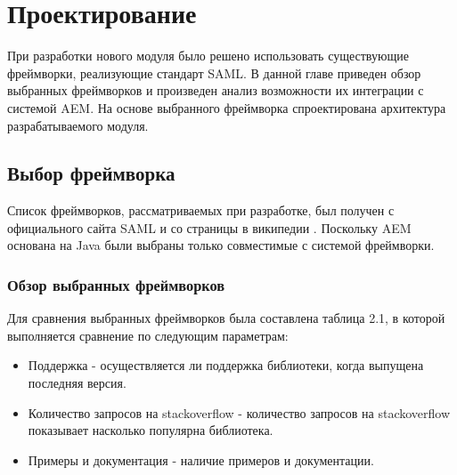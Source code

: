 \chapter{Проектирование}
\label{cha:design}

При разработки нового модуля было решено использовать существующие фреймворки, реализующие стандарт SAML. В данной главе приведен обзор выбранных фреймворков и произведен анализ возможности их интеграции с системой AEM. На основе выбранного фреймворка спроектирована архитектура разрабатываемого модуля. 

\section{Выбор фреймворка}
Список фреймворков, рассматриваемых при разработке, был получен с официального сайта SAML \cite{web:samlFrameworksOasis} и со страницы в википедии \cite{web:samlFrameworksWiki}. Поскольку AEM основана на Java были выбраны только совместимые с системой фреймворки. 

\subsection{Обзор выбранных фреймворков}
Для сравнения выбранных фреймворков была составлена таблица 2.1, в которой выполняется сравнение по следующим параметрам:

\begin{itemize}
\item Поддержка - осуществляется ли поддержка библиотеки, когда выпущена последняя версия.
\item Количество запросов на stackoverflow - количество запросов на stackoverflow показывает насколько популярна библиотека.
\item Примеры и документация - наличие примеров и документации.
\end{itemize}


